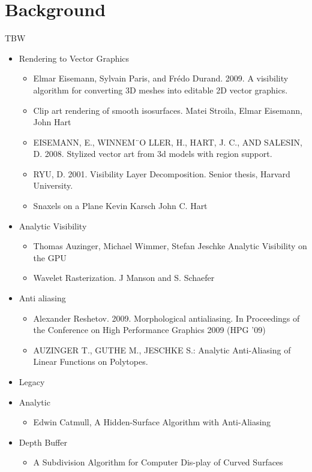 \documentclass[review]{acmsiggraph}
\begin{document}
\section{Background}
TBW
\begin{itemize}
\item Rendering to Vector Graphics 
\begin{itemize}
\item Elmar Eisemann, Sylvain Paris, and Frédo Durand. 2009. A visibility algorithm for converting 3D meshes into editable 2D vector graphics. 
\item Clip art rendering of smooth isosurfaces. Matei Stroila, Elmar Eisemann, John Hart
\item EISEMANN, E., WINNEM¨O LLER, H., HART, J. C., AND SALESIN, D. 2008. Stylized vector art from 3d models with region support.
\item RYU, D. 2001. Visibility Layer Decomposition. Senior thesis, Harvard University.
\item Snaxels on a Plane Kevin Karsch John C. Hart 
\end{itemize}
\item Analytic Visibility
\begin{itemize}
\item Thomas Auzinger, Michael Wimmer, Stefan Jeschke Analytic Visibility on the GPU
\item Wavelet Rasterization. J  Manson and S. Schaefer
\end{itemize}
\item Anti aliasing
\begin{itemize}
\item Alexander Reshetov. 2009. Morphological antialiasing. In Proceedings of the Conference on High Performance Graphics 2009 (HPG '09)
\item AUZINGER T., GUTHE M., JESCHKE S.: Analytic Anti-Aliasing of Linear Functions on Polytopes.
\end{itemize}
\item Legacy 
\item Analytic
\begin{itemize}
\item Edwin Catmull, A Hidden-Surface Algorithm with Anti-Aliasing
\end{itemize}
\item Depth Buffer
\begin{itemize}
\item A Subdivision Algorithm for Computer Dis-play of Curved Surfaces
\end{itemize}

\end{itemize}
\end{document}
